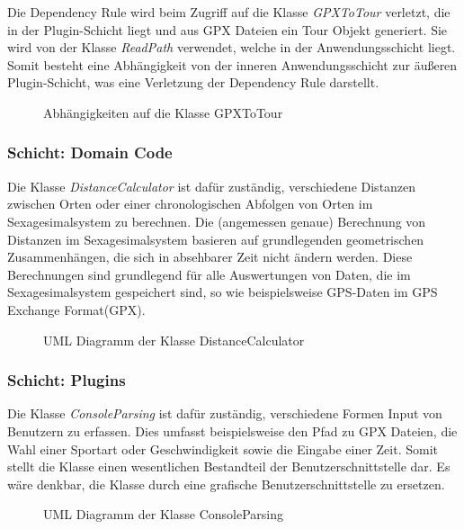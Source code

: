 Die Dependency Rule wird beim Zugriff auf die Klasse \textit{GPXToTour} verletzt, die in der Plugin-Schicht liegt und aus GPX Dateien ein Tour Objekt generiert. Sie wird von der Klasse \textit{ReadPath} verwendet, welche in der Anwendungsschicht liegt. Somit besteht eine Abhängigkeit von der inneren Anwendungsschicht zur äußeren Plugin-Schicht, was eine Verletzung der Dependency Rule darstellt.

\begin{figure}[H]
  \centering
  
  \caption{Abhängigkeiten auf die Klasse GPXToTour}
\end{figure}

\subsubsection{Schicht: Domain Code}

Die Klasse \textit{DistanceCalculator} ist dafür zuständig, verschiedene Distanzen zwischen Orten oder einer chronologischen Abfolgen von Orten im Sexagesimalsystem zu berechnen.
Die (angemessen genaue) Berechnung von Distanzen im Sexagesimalsystem basieren auf grundlegenden geometrischen Zusammenhängen, die sich in absehbarer Zeit nicht ändern werden. 
Diese Berechnungen sind grundlegend für alle Auswertungen von Daten, die im Sexagesimalsystem gespeichert sind, so wie beispielsweise GPS-Daten im GPS Exchange Format(GPX).

\begin{figure}[H]
  \centering
  
  \caption{UML Diagramm der Klasse DistanceCalculator}
\end{figure}

\subsubsection{Schicht: Plugins}

Die Klasse \textit{ConsoleParsing} ist dafür zuständig, verschiedene Formen Input von Benutzern zu erfassen.
Dies umfasst beispielsweise den Pfad zu GPX Dateien, die Wahl einer Sportart oder Geschwindigkeit sowie die Eingabe einer Zeit.
Somit stellt die Klasse einen wesentlichen Bestandteil der Benutzerschnittstelle dar.
Es wäre denkbar, die Klasse durch eine grafische Benutzerschnittstelle zu ersetzen.

\begin{figure}[H]
  \centering
  
  \caption{UML Diagramm der Klasse ConsoleParsing}
\end{figure}


